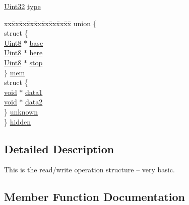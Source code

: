 \begin{DoxyCompactItemize}
\mbox{\hyperlink{_s_d_l__stdinc_8h_add440eff171ea5f55cb00c4a9ab8672d}{Uint32}} \mbox{\hyperlink{struct_s_d_l___r_wops_a099017bfceaac24ced0e4d08a4e0a023}{type}}
\item 
\begin{tabbing}
xx\=xx\=xx\=xx\=xx\=xx\=xx\=xx\=xx\=\kill
union \{\\
\>struct \{\\
\>\>\mbox{\hyperlink{_s_d_l__stdinc_8h_a2944638813a090aa23e62f4da842c3e2}{Uint8}} $\ast$ \mbox{\hyperlink{struct_s_d_l___r_wops_af9b489d7342296ce197b911cfa93b2ab}{base}}\\
\>\>\mbox{\hyperlink{_s_d_l__stdinc_8h_a2944638813a090aa23e62f4da842c3e2}{Uint8}} $\ast$ \mbox{\hyperlink{struct_s_d_l___r_wops_a6fc84601c17e347c6ef24c63a79deb57}{here}}\\
\>\>\mbox{\hyperlink{_s_d_l__stdinc_8h_a2944638813a090aa23e62f4da842c3e2}{Uint8}} $\ast$ \mbox{\hyperlink{struct_s_d_l___r_wops_a4108a41afa8b62e75b0f160de4b56103}{stop}}\\
\>\} \mbox{\hyperlink{struct_s_d_l___r_wops_ad65f424ffdc50b2da45def5137d37c20}{mem}}\\
\>struct \{\\
\>\>\mbox{\hyperlink{_s_d_l__opengles2__gl2ext_8h_ae5d8fa23ad07c48bb609509eae494c95}{void}} $\ast$ \mbox{\hyperlink{struct_s_d_l___r_wops_ab89d27b4312c0b9d664c81bc92917fc8}{data1}}\\
\>\>\mbox{\hyperlink{_s_d_l__opengles2__gl2ext_8h_ae5d8fa23ad07c48bb609509eae494c95}{void}} $\ast$ \mbox{\hyperlink{struct_s_d_l___r_wops_aca073130e2e262eb11e86e1be993e215}{data2}}\\
\>\} \mbox{\hyperlink{struct_s_d_l___r_wops_ab55ae656e13ea9ba8df609d6b04e57c1}{unknown}}\\
\} \mbox{\hyperlink{struct_s_d_l___r_wops_a92c73a5eabda369d822ddac6e95fd7fb}{hidden}}\\

\end{tabbing}\end{DoxyCompactItemize}


\subsection{Detailed Description}
This is the read/write operation structure -- very basic. 

\subsection{Member Function Documentation}
\mbox{\label{struct_s_d_l___r_wops_ab303bcbb0f6742a141ba8b2998923f47}} 
